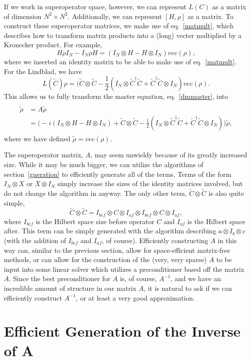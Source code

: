 \documentclass{article}
\begin{document}
If we work in superoperator space, however, we can represent $L(C)$ as a matrix of dimension
$N^2 \times N^2$. Additionally, we can represent $[H,\rho]$ as a matrix. To construct these
superoperator matrices, we make use of eq.~\ref{matmult}, which describes how to transform
matrix products into a (long) vecter multiplied by a Kronecker product. For example,
\begin{equation}
  H\rho I_N - I_N \rho H = (I_N \otimes H - H \otimes I_N)vec(\rho),
\end{equation}
where we inserted an identity matrix to be able to make use of eq.~\ref{matmult}. For the
Lindblad, we have
\begin{equation}
  L(\tilde{C})\rho = (\tilde{C}\otimes \tilde{C} - \frac{1}{2}
  (I_N \otimes \tilde{C}^\dagger \tilde{C} + \tilde{C}^\dagger \tilde{C} \otimes I_N)vec(\rho).
\end{equation}
This allows us to fully transform the master equation, eq.~\ref{dmmaster}, into
\begin{align}\label{superdm}
  \begin{split}
    \dot{\tilde{\rho}} &= A\tilde{\rho} \\
    &=\Big(-i (I_N \otimes H - H \otimes I_N) + \tilde{C}\otimes \tilde{C} - \frac{1}{2}
    (I_N\otimes \tilde{C}^\dagger \tilde{C} +
    \tilde{C}^\dagger \tilde{C} \otimes I_N)\Big) \tilde{\rho},
  \end{split}
\end{align}
where we have defined $\tilde{\rho} = vec(\rho)$.

The superoperator matrix, $A$, may seem unwieldy because of its greatly increased size.
While it may be much bigger, we can utilize the algorithms of section~\ref{gneration}
to efficiently generate all of the terms. Terms of the form $I_N \otimes X$ or
$X \otimes I_N$ simply
increase the sizes of the identity matrices involved, but do not change the algorithm in anyway.
The only other term, $\tilde{C} \otimes \tilde{C}$ is also quite simple,
\begin{equation}
  \tilde{C}\otimes \tilde{C} = I_{bef} \otimes C \otimes I_{af} \otimes
  I_{bef} \otimes C \otimes I_{af},
\end{equation}
where $I_{bef}$ is the Hilbert space size before operator $C$ and $I_{af}$ is the Hilbert
space after. This term can be simply generated with the algorithm describing
$a \otimes I_b \otimes c$ (with the addition of $I_{bef}$ and $I_{af}$, of course). Efficiently
constructing $A$ in this way can, similar to the previous section, allow for space-efficient
matrix-free methods, or can allow for the construction of the (very, very sparse) $A$ to be input
into some linear solver which utilizes a preconditioner based off the matrix $A$. Since
the best preconditioner for $A$ is, of course, $A^{-1}$, and we have an incredible amount of
structure in our matrix $A$, it is natural to ask if we can efficiently construct $A^{-1}$, or
at least a very good approximation.

\section{Efficient Generation of the Inverse of A}
\end{document}
